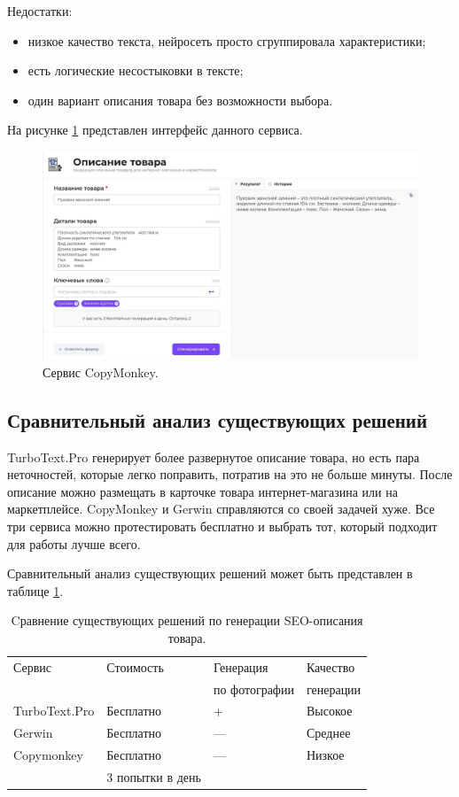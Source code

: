 \documentclass[a4paper,12pt]{extarticle}
\begin{document}
Недостатки:
\begin{itemize}
	\item низкое качество текста, нейросеть просто сгруппировала характеристики;
	\item есть логические несостыковки в тексте;
	\item один вариант описания товара без возможности выбора.
\end{itemize}

На рисунке \ref{fig:copymonkey} представлен интерфейс данного сервиса.

\begin{figure}[ht]
	\centering
	\includegraphics[scale=0.35]{copymonkey.png}
	\caption{Сервис CopyMonkey.}
	\label{fig:copymonkey}
\end{figure}

\newpage
\subsection{Сравнительный анализ существующих решений}

TurboText.Pro генерирует более развернутое описание товара, но есть пара неточностей, которые легко поправить, потратив на это не больше минуты. После описание можно размещать в карточке товара интернет-магазина или на маркетплейсе. CopyMonkey и Gerwin справляются со своей задачей хуже. Все три сервиса можно протестировать бесплатно и выбрать тот, который подходит для работы лучше всего.

Сравнительный анализ существующих решений может быть представлен в таблице \ref{compare_exist}.

\begin{table}[h]
	\centering
	\begin{tabular}{ | l | l | l | l | }
		\hline
		Сервис & Стоимость & Генерация & Качество \\
		& & по фотографии & генерации \\ \hline
		TurboText.Pro & Бесплатно & + & Высокое  \\ \hline
		Gerwin & Бесплатно & — & Среднее \\ \hline
		Copymonkey & Бесплатно & — & Низкое \\
		& 3 попытки в день &  &  \\ \hline
	\end{tabular}
	\caption{Cравнение существующих решений по генерации SEO-описания товара.}
	\label{compare_exist}
\end{table}
\end{document}
